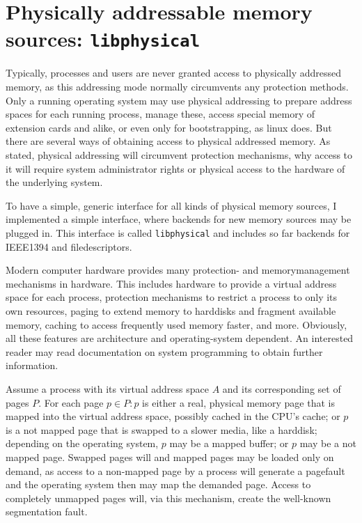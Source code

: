 %
%

\section{Physically addressable memory sources: \texttt{libphysical}}

Typically, processes and users are never granted access to physically addressed
memory, as this addressing mode normally circumvents any protection methods.
Only a running operating system may use physical addressing to prepare address
spaces for each running process, manage these, access special memory of
extension cards and alike, or even only for bootstrapping, as linux does. But
there are several ways of obtaining access to physical addressed memory. As
stated, physical addressing will circumvent protection mechanisms, why access to
it will require system administrator rights or physical access to the hardware
of the underlying system.

To have a simple, generic interface for all kinds of physical memory sources, I
implemented a simple interface, where backends for new memory sources may be
plugged in. This interface is called \texttt{libphysical} and includes so far
backends for IEEE1394 and filedescriptors.

Modern computer hardware provides many protection- and memorymanagement
mechanisms in hardware. This includes hardware to provide a virtual address
space for each process, protection mechanisms to restrict a process to only its
own resources, paging to extend memory to harddisks and fragment available
memory, caching to access frequently used memory faster, and more. Obviously,
all these features are architecture and operating-system dependent. An
interested reader may read documentation on system programming to obtain further
information.

Assume a process with its virtual address space $A$ and its corresponding set
of pages $P$. For each page $p \in P: p$ is either a real, physical memory page
that is mapped into the virtual address space, possibly cached in the CPU's
cache; or $p$ is a not mapped page that is swapped to a slower media, like a
harddisk; depending on the operating system, $p$ may be a mapped buffer; or $p$
may be a not mapped page. Swapped pages will and mapped pages may be loaded
only on demand, as access to a non-mapped page by a process will generate a
pagefault and the operating system then may map the demanded page.  Access to
completely unmapped pages will, via this mechanism, create the well-known
segmentation fault.


